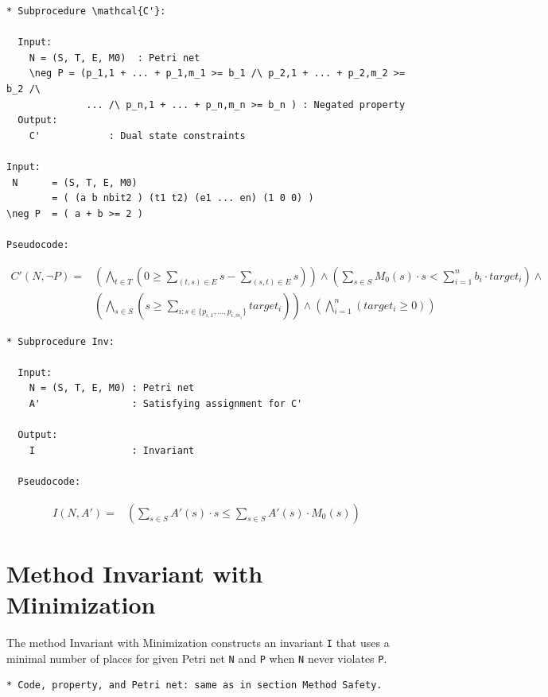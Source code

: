 \documentclass{llncs}
\begin{document}
\newpage
\begin{verbatim}
* Subprocedure \mathcal{C'}:

  Input:
    N = (S, T, E, M0)  : Petri net
    \neg P = (p_1,1 + ... + p_1,m_1 >= b_1 /\ p_2,1 + ... + p_2,m_2 >= b_2 /\
              ... /\ p_n,1 + ... + p_n,m_n >= b_n ) : Negated property
  Output:
    C'            : Dual state constraints

Input:
 N      = (S, T, E, M0)
        = ( (a b nbit2 ) (t1 t2) (e1 ... en) (1 0 0) )
\neg P  = ( a + b >= 2 )

Pseudocode:
\end{verbatim}

\begin{align*}
  C'(N, \neg P) =& \left( \bigwedge_{t \in T} \left( 0 \ge
                      \sum_{(t, s) \in E} s
                    - \sum_{(s, t) \in E} s \right) \right) \land
     \left( \sum_{s \in S} M_0(s) \cdot s <
       \sum_{i=1}^n b_i \cdot target_i \right) \land \\
     & \left( \bigwedge_{s \in S} \left ( s \ge 
       \sum_{i : s \in \{ p_{i,1}, \ldots, p_{i,m_i} \} } target_i \right) \right) \land
     \left( \bigwedge_{i=1}^n \left( target_i \ge 0 \right) \right)
\end{align*}

\begin{verbatim}
* Subprocedure Inv:

  Input:
    N = (S, T, E, M0) : Petri net
    A'                : Satisfying assignment for C'

  Output:
    I                 : Invariant

  Pseudocode:
\end{verbatim}

\begin{align*}
  I(N, A') =& \left( \sum_{s \in S} A'(s) \cdot s \le
                     \sum_{s \in S} A'(s) \cdot M_0(s) \right)
\end{align*}

\newpage
\section{Method Invariant with Minimization}

The method Invariant with Minimization constructs an invariant \verb=I=
that uses a minimal number of places for given Petri net \verb=N= and
\verb=P= when \verb=N= never violates \verb=P=. 

\begin{verbatim}
* Code, property, and Petri net: same as in section Method Safety.
\end{verbatim}
\end{document}
